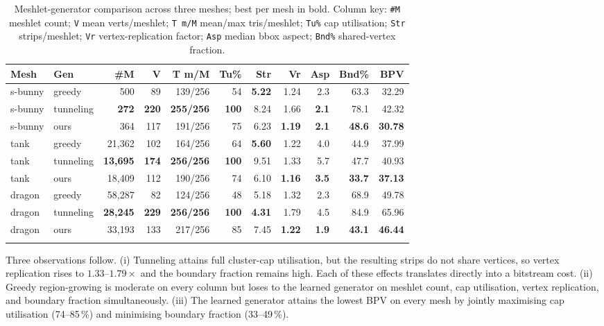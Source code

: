 \documentclass[pdflatex,sn-vancouver-num]{sn-jnl}%
\theoremstyle{thmstyleone}%
\theoremstyle{thmstyletwo}%
\theoremstyle{thmstylethree}%
\begin{document}
\begin{table}[ht]
\caption[Meshlet-generator comparison across three meshes.]{Meshlet-generator comparison across three meshes; best per mesh in bold. Column key: \texttt{\#M} meshlet count; \texttt{V} mean verts/meshlet; \texttt{T m/M} mean/max tris/meshlet; \texttt{Tu\%} cap utilisation; \texttt{Str} strips/meshlet; \texttt{Vr} vertex-replication factor; \texttt{Asp} median bbox aspect; \texttt{Bnd\%} shared-vertex fraction.}\label{tab:gencompare}
\centering
\scriptsize
\setlength{\tabcolsep}{4pt}
\begin{tabular}{@{}llrrrrrrrrr@{}}
\toprule
Mesh & Gen & \#M & V & T m/M & Tu\% & Str & Vr & Asp & Bnd\% & BPV \\
\midrule
s-bunny & greedy    & 500 & 89 & 139/256 & 54 & \textbf{5.22} & 1.24 & 2.3 & 63.3 & 32.29 \\
s-bunny & tunneling & \textbf{272} & \textbf{220} & \textbf{255/256} & \textbf{100} & 8.24 & 1.66 & \textbf{2.1} & 78.1 & 42.32 \\
s-bunny & ours      & 364 & 117 & 191/256 & 75 & 6.23 & \textbf{1.19} & \textbf{2.1} & \textbf{48.6} & \textbf{30.78} \\
tank    & greedy    & 21{,}362 & 102 & 164/256 & 64 & \textbf{5.60} & 1.22 & 4.0 & 44.9 & 37.99 \\
tank    & tunneling & \textbf{13{,}695} & \textbf{174} & \textbf{256/256} & \textbf{100} & 9.51 & 1.33 & 5.7 & 47.7 & 40.93 \\
tank    & ours      & 18{,}409 & 112 & 190/256 & 74 & 6.10 & \textbf{1.16} & \textbf{3.5} & \textbf{33.7} & \textbf{37.13} \\
dragon  & greedy    & 58{,}287 & 82 & 124/256 & 48 & 5.18 & 1.32 & 2.3 & 68.9 & 49.78 \\
dragon  & tunneling & \textbf{28{,}245} & \textbf{229} & \textbf{256/256} & \textbf{100} & \textbf{4.31} & 1.79 & 4.5 & 84.9 & 65.96 \\
dragon  & ours      & 33{,}193 & 133 & 217/256 & 85 & 7.45 & \textbf{1.22} & \textbf{1.9} & \textbf{43.1} & \textbf{46.44} \\
\botrule
\end{tabular}
\end{table}

Three observations follow. (i) Tunneling attains full cluster-cap utilisation, but the resulting strips do not share vertices, so vertex replication rises to $1.33$--$1.79\times$ and the boundary fraction remains high. Each of these effects translates directly into a bitstream cost. (ii) Greedy region-growing is moderate on every column but loses to the learned generator on meshlet count, cap utilisation, vertex replication, and boundary fraction simultaneously. (iii) The learned generator attains the lowest BPV on every mesh by jointly maximising cap utilisation (74--85\,\%) and minimising boundary fraction (33--49\,\%).
\end{document}
